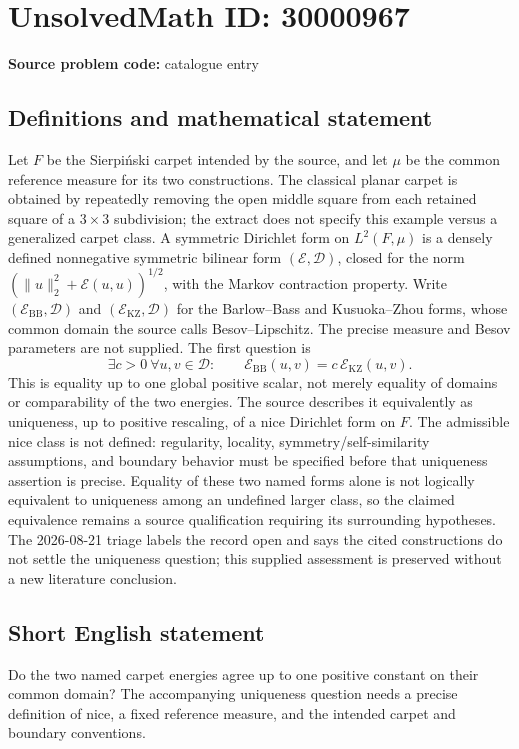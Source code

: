 \documentclass[11pt]{article}
\begin{document}
\section*{UnsolvedMath ID: 30000967}
\textbf{Source problem code:} catalogue entry
\subsection{Definitions and mathematical statement}
Let $F$ be the Sierpi\'nski carpet intended by the source, and let $\mu$ be the common reference measure for its two constructions. The classical planar carpet is obtained by repeatedly removing the open middle square from each retained square of a $3\times3$ subdivision; the extract does not specify this example versus a generalized carpet class. A symmetric Dirichlet form on $L^2(F,\mu)$ is a densely defined nonnegative symmetric bilinear form $(\mathcal E,\mathcal D)$, closed for the norm $(\|u\|_2^2+\mathcal E(u,u))^{1/2}$, with the Markov contraction property. Write $(\mathcal E_{\mathrm{BB}},\mathcal D)$ and $(\mathcal E_{\mathrm{KZ}},\mathcal D)$ for the Barlow--Bass and Kusuoka--Zhou forms, whose common domain the source calls Besov--Lipschitz. The precise measure and Besov parameters are not supplied. The first question is \[\exists c>0\ \forall u,v\in\mathcal D:\qquad \mathcal E_{\mathrm{BB}}(u,v)=c\,\mathcal E_{\mathrm{KZ}}(u,v).\] This is equality up to one global positive scalar, not merely equality of domains or comparability of the two energies. The source describes it equivalently as uniqueness, up to positive rescaling, of a nice Dirichlet form on $F$. The admissible nice class is not defined: regularity, locality, symmetry/self-similarity assumptions, and boundary behavior must be specified before that uniqueness assertion is precise. Equality of these two named forms alone is not logically equivalent to uniqueness among an undefined larger class, so the claimed equivalence remains a source qualification requiring its surrounding hypotheses. The 2026-08-21 triage labels the record open and says the cited constructions do not settle the uniqueness question; this supplied assessment is preserved without a new literature conclusion.
\subsection{Short English statement}
Do the two named carpet energies agree up to one positive constant on their common domain? The accompanying uniqueness question needs a precise definition of nice, a fixed reference measure, and the intended carpet and boundary conventions.
\end{document}
